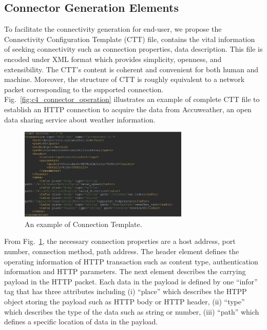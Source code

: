 \subsection{Connector Generation Elements}
To facilitate the connectivity generation for end-user, we propose the Connectivity Configuration Template (CTT) file, contains the vital information of seeking connectivity such as connection properties, data description. This file is encoded under XML format which provides simplicity, openness, and extensibility. The CTT’s content is coherent and convenient for both human and machine. Moreover, the structure of CTT is roughly equivalent to a network packet corresponding to the supported connection. Fig.~\ref{fig:c4_connector_operation} illustrates an example of complete CTT file to establish an HTTP connection to acquire the data from Accuweather, an open data sharing service about weather information.\\

\begin{figure}[h!] 
 \begin{center} 
 \includegraphics[width=0.72\textwidth]{./Part2/Chapter4/figures/connector_template.png} 
    \caption{An example of Connection Template.}
     \label{fig:c4_connector_template}
  \end{center} 
\end{figure}

From Fig.~\ref{fig:c4_connector_template}, the necessary connection properties are a host address, port number, connection method, path address. The header element defines the operating information of HTTP transaction such as content type, authentication information and HTTP parameters. The next element describes the carrying payload in the HTTP packet. Each data in the payload is defined by one ``infor'' tag that has three attributes including (i) ``place'' which describes the HTPP object storing the payload such as HTTP body or HTTP header, (ii) ``type'' which describes the type of the data such as string or number, (iii) ``path'' which defines a specific location of data in the payload.\\

